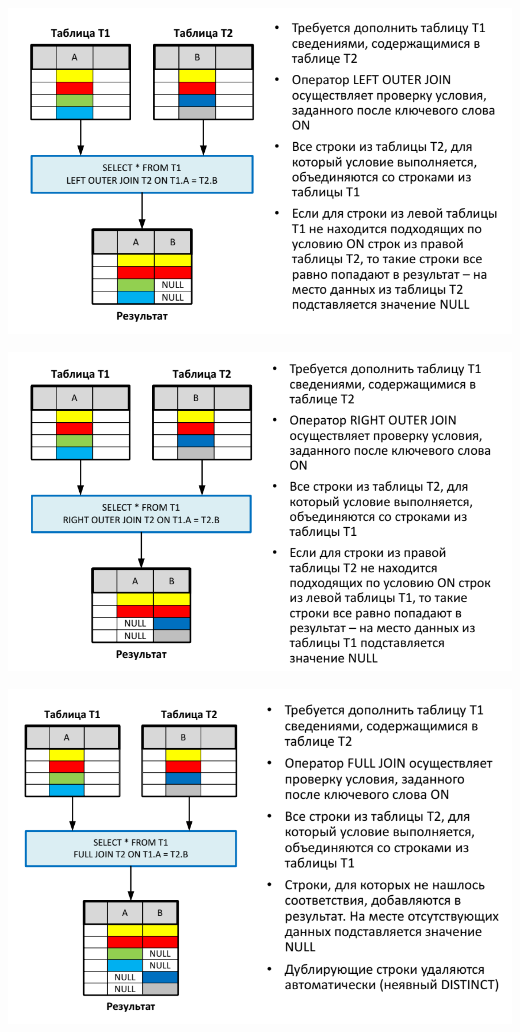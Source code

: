 \documentclass{beamer}
\begin{document}
\begin{frame}
	\begin{center}
		\includegraphics[scale=0.5]{images/cs-04.png}
	\end{center}
\end{frame} 

\begin{frame}
	\begin{center}
		\includegraphics[scale=0.5]{images/cs-05.png}
	\end{center}
\end{frame} 

\begin{frame}
	\begin{center}
		\includegraphics[scale=0.5]{images/cs-06.png}
	\end{center}
\end{frame} 
\end{document}
